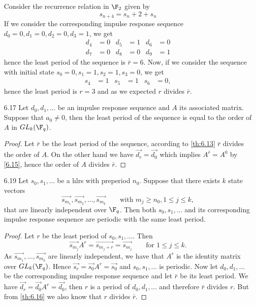 \begin{ese}
	Consider the recurrence relation in \(\F_2\) given by
	\[
		s_{n+4} = s_n+2 + s_n 
	\]
	If we consider the corresponding impulse response sequence \(d_0=0,d_1=0,d_2=0,d_3=1\), we get
	\begin{align*}
		d_4 & = 0 & d_5 & = 1 & d_6 & = 0  \\
		d_7 & = 0 & d_8 & =0  & d_9 & = 1
	\end{align*}
	hence the least period of the sequence is \(\bar{r}=6\).
	Now, if we consider the sequence with initial state \(s_0=0,s_1=1,s_2=1,s_3=0\), we get
	\begin{align*}
		s_4 & = 1 & s_5 & = 1 & s_6 & =0,
	\end{align*}
	hence the least period is \(r=3\) and as we expected \(r\) divides \(\bar{r}\).
\end{ese}

\begin{teor}{}{6.17}
	Let \(d_0,d_1,\ldots\) be an impulse response sequence and \(A\) its associated matrix. Suppose that \(a_0\neq 0\), then the least period of the sequence is equal to the order of \(A\) in \(GL_k(\F_q)\).
\end{teor}

\begin{proof}
	Let \(\bar{r}\) be the least period of the sequence, according to \autoref{th:6.13} \(\bar{r}\) divides the order of \(A\). On the other hand we have \(\vec{d_r}=\vec{d_0}\) which implies \(A^{\bar{r}} = A^0\) by \autoref{6.15}, hence the order of \(A\) divides \(\bar{r}\).
\end{proof}

\begin{teor}{}{6.19}
	Let \(s_0,s_1,\ldots\) be a hlrs with preperiod \(n_0\). Suppose that there exists \(k\) state vectors
	\[
		\vec{s_{m_1}},\vec{s_{m_2}},\ldots,\vec{s_{m_k}} \qquad\text{with }m_j \ge n_0, 1 \le j \le k,
	\]
	that are linearly independent  over \(\F_q\). Then both \(s_0,s_1,\ldots\) and its corresponding impulse response sequence are periodic with the same least period.
\end{teor}

\begin{proof}
	Let \(r\) be the least period of \(s_0,s_1,\ldots\). Then
	\[
		\vec{s_{m_j}}A^r = \vec{s_{m_j+r}} = \vec{s_{m_j}} \qquad\text{for }1 \le j \le k.
	\]
	As \(\vec{s_{m_1}},\ldots,\vec{s_{m_k}}\) are linearly independent, we have that \(A^r\) is the identity matrix over \(GL_k(\F_q)\). Hence \(\vec{s_r} = \vec{s_0}A^r = \vec{s_0}\) and \(s_0,s_1,\ldots\) is periodic.
	Now let \(d_0,d_1,\ldots\) be the corresponding impulse response sequence and let \(\bar{r}\) be its least period. We have \(\vec{d_r} = \vec{d_0}A^r = \vec{d_0}\), then \(r\) is a period of \(d_0,d_1,\ldots\) and therefore \(\bar{r}\) divides \(r\). But from \autoref{th:6.16} we also know that \(r\) divides \(\bar{r}\).
\end{proof}

